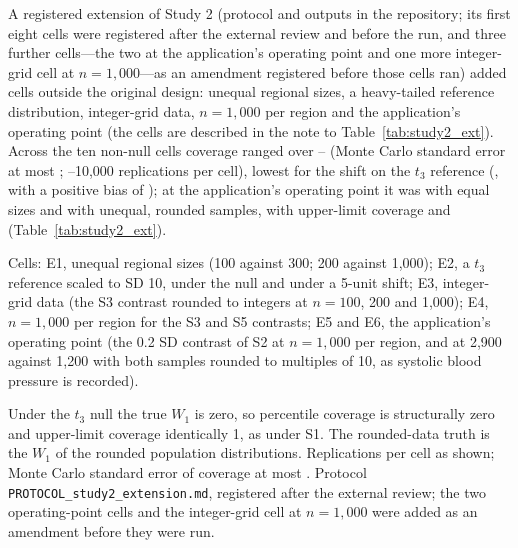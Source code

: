 \documentclass[AMA,Times1COL]{WileyNJDv5}
\begin{document}
A registered extension of Study 2 (protocol and outputs in the repository; its first eight cells were registered after the external review and before the run, and three further cells---the two at the application's operating point and one more integer-grid cell at $n = 1{,}000$---as an amendment registered before those cells ran) added cells outside the original design: unequal regional sizes, a heavy-tailed reference distribution, integer-grid data, $n = 1{,}000$ per region and the application's operating point (the cells are described in the note to Table~\ref{tab:study2_ext}). Across the ten non-null cells coverage ranged over -- (Monte Carlo standard error at most ; --10{,}000 replications per cell), lowest for the shift on the $t_3$ reference (, with a positive bias of ); at the application's operating point it was  with equal sizes and  with unequal, rounded samples, with upper-limit coverage  and  (Table~\ref{tab:study2_ext}).

\begin{table}[ht]
\centering
\caption{Registered extension of Study 2: unequal regional sizes, a $t_3$ reference distribution, integer-grid data, $n = 1{,}000$ per region and the application's operating point (0.2 SD). Bias, RMSE and mean width in the original units; coverage of the 95\% percentile interval and of its one-sided 97.5\% upper limit.\label{tab:study2_ext}}
\begin{tablenotes}
\item Cells: E1, unequal regional sizes (100 against 300; 200 against 1{,}000); E2, a $t_3$ reference scaled to SD 10, under the null and under a 5-unit shift; E3, integer-grid data (the S3 contrast rounded to integers at $n = 100$, 200 and 1{,}000); E4, $n = 1{,}000$ per region for the S3 and S5 contrasts; E5 and E6, the application's operating point (the 0.2 SD contrast of S2 at $n = 1{,}000$ per region, and at 2{,}900 against 1{,}200 with both samples rounded to multiples of 10, as systolic blood pressure is recorded).
\item Under the $t_3$ null the true $W_1$ is zero, so percentile coverage is structurally zero and upper-limit coverage identically 1, as under S1. The rounded-data truth is the $W_1$ of the rounded population distributions. Replications per cell as shown; Monte Carlo standard error of coverage at most . Protocol \texttt{PROTOCOL\_study2\_extension.md}, registered after the external review; the two operating-point cells and the integer-grid cell at $n = 1{,}000$ were added as an amendment before they were run.
\end{tablenotes}
\end{table}
\end{document}
